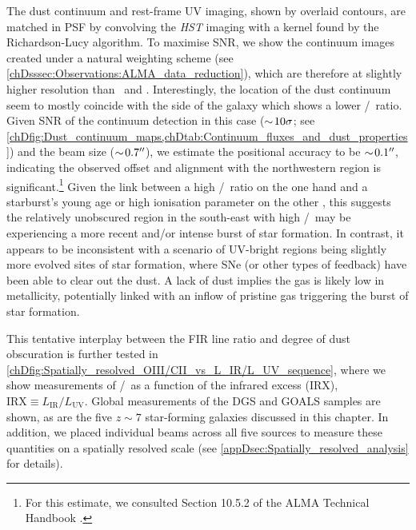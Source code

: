 The dust continuum and rest-frame UV imaging, shown by overlaid contours, are matched in PSF by convolving the \textit{HST} imaging with a kernel found by the Richardson-Lucy algorithm. To maximise SNR, we show the continuum images created under a natural weighting scheme (see \cref{chDsssec:Observations:ALMA_data_reduction}), which are therefore at slightly higher resolution than \OIIIf\ and \CII. Interestingly, the location of the dust continuum seem to mostly coincide with the side of the galaxy which shows a lower \OIIIf/\CII\ ratio. Given SNR of the continuum detection in this case ($\sim \! 10 \sigma$; see \cref{chDfig:Dust_continuum_maps,chDtab:Continuum_fluxes_and_dust_properties}) and the beam size ($\sim \! 0.7 \hbox{$^{\prime\prime}$}$), we estimate the positional accuracy to be $\sim \! 0.1 \hbox{$^{\prime\prime}$}$, indicating the observed offset and alignment with the northwestern region is significant.\footnote{For this estimate, we consulted Section 10.5.2 of the ALMA Technical Handbook \citep{ALMA_technical_handbook}.} Given the link between a high \OIIIf/\CII\ ratio on the one hand and a starburst's young age or high ionisation parameter on the other \citep[as shown in \cref{chDssec:Discussion:OIII/CII_theoretical_insights}; see also e.g.][]{2021MNRAS.505.5543V}, this suggests the relatively unobscured region in the south-east with high \OIIIf/\CII\ may be experiencing a more recent and/or intense burst of star formation. In contrast, it appears to be inconsistent with a scenario of UV-bright regions being slightly more evolved sites of star formation, where SNe (or other types of feedback) have been able to clear out the dust. A lack of dust implies the gas is likely low in metallicity, potentially linked with an inflow of pristine gas triggering the burst of star formation.

This tentative interplay between the FIR line ratio and degree of dust obscuration is further tested in \cref{chDfig:Spatially_resolved_OIII/CII_vs_L_IR/L_UV_sequence}, where we show measurements of \OIIIf/\CII\ as a function of the infrared excess (IRX), $\text{IRX} \equiv L_\text{IR}/L_\text{UV}$. Global measurements of the DGS and GOALS samples are shown, as are the five $z \sim 7$ star-forming galaxies discussed in this chapter. In addition, we placed individual beams across all five sources to measure these quantities on a spatially resolved scale (see \cref{appDsec:Spatially_resolved_analysis} for details).

